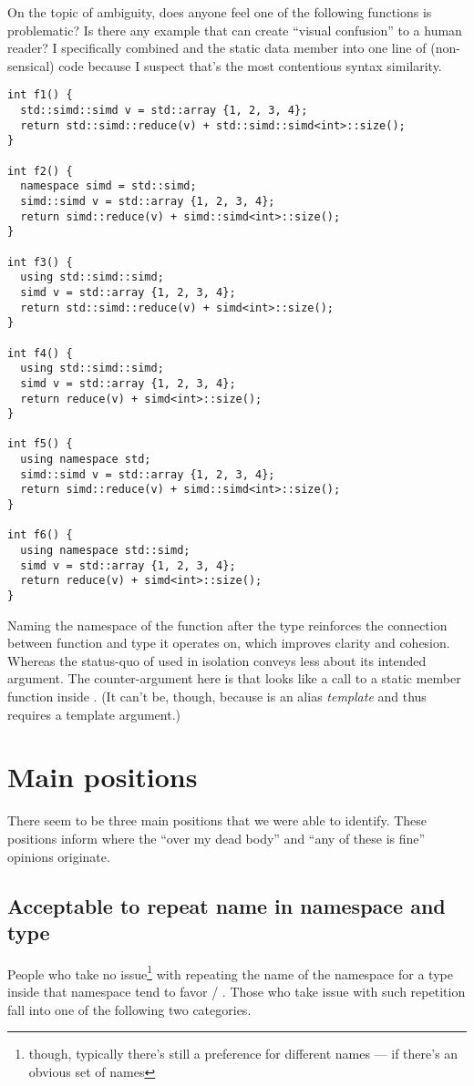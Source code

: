On the topic of ambiguity, does anyone feel one of the following functions is problematic?
Is there any example that can create “visual confusion” to a human reader?
I specifically combined  and the static data member  into one line of
(non-sensical) code because I suspect that's the most contentious syntax similarity.
\medskip\begin{lstlisting}[style=Vc]
int f1() {
  std::simd::simd v = std::array {1, 2, 3, 4};
  return std::simd::reduce(v) + std::simd::simd<int>::size();
}

int f2() {
  namespace simd = std::simd;
  simd::simd v = std::array {1, 2, 3, 4};
  return simd::reduce(v) + simd::simd<int>::size();
}

int f3() {
  using std::simd::simd;
  simd v = std::array {1, 2, 3, 4};
  return std::simd::reduce(v) + simd<int>::size();
}

int f4() {
  using std::simd::simd;
  simd v = std::array {1, 2, 3, 4};
  return reduce(v) + simd<int>::size();
}

int f5() {
  using namespace std;
  simd::simd v = std::array {1, 2, 3, 4};
  return simd::reduce(v) + simd::simd<int>::size();
}

int f6() {
  using namespace std::simd;
  simd v = std::array {1, 2, 3, 4};
  return reduce(v) + simd<int>::size();
}
\end{lstlisting}
Naming the namespace of the  function after the type reinforces the
connection between function and type it operates on, which improves clarity and cohesion.
Whereas the status-quo of \stddatapar{} used in isolation conveys less about its intended
argument.
The counter-argument here is that  looks like a call to a static member function
inside . (It can't be, though, because  is an alias \emph{template} and thus
requires a template argument.)

\section{Main positions}

There seem to be three main positions that we were able to identify.
These positions inform where the “over my dead body” and “any of these is fine” opinions originate.

\subsection{Acceptable to repeat name in namespace and type}
People who take no issue\footnote{though, typically there's still a preference for different names
--- if there's an obvious set of names} with repeating the name of the namespace for a type inside
that namespace tend to favor \stdsimd{} / \stdsimd{}.
Those who take issue with such repetition fall into one of the following two categories.


